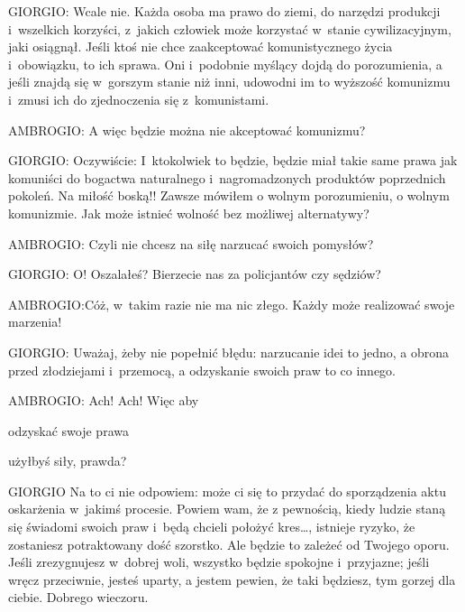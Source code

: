\documentclass[oneside,polish,11pt,sfheadings]{mwbk}
\begin{document}
 
\noindent GIORGIO: Wcale nie. Każda osoba ma prawo do ziemi, do narzędzi produkcji i~wszelkich korzyści, z~jakich człowiek może
korzystać w~stanie cywilizacyjnym, jaki osiągnął. Jeśli ktoś nie chce zaakceptować komunistycznego życia i~obowiązku,
to ich sprawa. Oni i~podobnie myślący dojdą do porozumienia, a jeśli znajdą się w~gorszym stanie niż inni, udowodni im
to wyższość komunizmu i~zmusi ich do zjednoczenia się z~komunistami. 




 
\noindent AMBROGIO: A więc będzie można nie akceptować komunizmu? 




 
\noindent GIORGIO: Oczywiście: I~ktokolwiek to będzie, będzie miał takie same prawa jak komuniści do bogactwa naturalnego i~nagromadzonych produktów poprzednich pokoleń. Na miłość boską!! Zawsze mówiłem o wolnym porozumieniu, o wolnym
komunizmie. Jak może istnieć wolność bez możliwej alternatywy? 




 
\noindent AMBROGIO: Czyli nie chcesz na siłę narzucać swoich pomysłów? 




 
\noindent GIORGIO: O! Oszalałeś? Bierzecie nas za policjantów czy sędziów? 




 
\noindent AMBROGIO:Cóż, w~takim razie nie ma nic złego. Każdy może realizować swoje marzenia! 




 
\noindent GIORGIO: Uważaj, żeby nie popełnić błędu: narzucanie idei to jedno, a obrona przed złodziejami i~przemocą, a odzyskanie
swoich praw to co innego. 




 
\noindent AMBROGIO: Ach! Ach! Więc aby \begin{itshape}odzyskać swoje prawa \end{itshape} użyłbyś siły,
prawda? 




 
\noindent GIORGIO Na to ci nie odpowiem: może ci się to przydać do sporządzenia aktu oskarżenia w~jakimś procesie. Powiem wam, że
z pewnością, kiedy ludzie staną się świadomi swoich praw i~będą chcieli położyć kres\ldots, istnieje ryzyko, że zostaniesz
potraktowany dość szorstko. Ale będzie to zależeć od Twojego oporu. Jeśli zrezygnujesz w~dobrej woli, wszystko będzie
spokojne i~przyjazne; jeśli wręcz przeciwnie, jesteś uparty, a jestem pewien, że taki będziesz, tym gorzej dla ciebie.
Dobrego wieczoru. 
\end{document}
